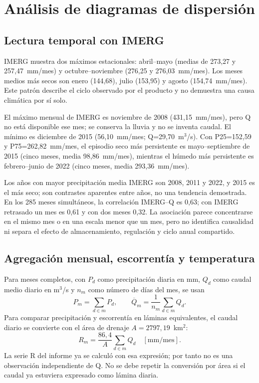 \section{Análisis de diagramas de dispersión}
\subsection{Lectura temporal con IMERG}
IMERG muestra dos máximos estacionales: abril--mayo (medias de 273,27 y 257,47~mm/mes) y octubre--noviembre (276,25 y 276,03~mm/mes). Los meses medios más secos son enero (144,68), julio (153,95) y agosto (154,74~mm/mes). Este patrón describe el ciclo observado por el producto y no demuestra una causa climática por sí solo.

El máximo mensual de IMERG es noviembre de 2008 (431,15~mm/mes), pero Q no está disponible ese mes; se conserva la lluvia y no se inventa caudal. El mínimo es diciembre de 2015 (56,10~mm/mes; Q=29,70~m$^3$/s). Con P25=152,59 y P75=262,82~mm/mes, el episodio seco más persistente es mayo--septiembre de 2015 (cinco meses, media 98,86~mm/mes), mientras el húmedo más persistente es febrero--junio de 2022 (cinco meses, media 293,36~mm/mes).

Los años con mayor precipitación media IMERG son 2008, 2011 y 2022, y 2015 es el más seco; son contrastes aparentes entre años, no una tendencia demostrada. En los 285 meses simultáneos, la correlación IMERG--Q es 0,63; con IMERG retrasado un mes es 0,61 y con dos meses 0,32. La asociación parece concentrarse en el mismo mes o en una escala menor que un mes, pero no identifica causalidad ni separa el efecto de almacenamiento, regulación y ciclo anual compartido.

\subsection{Agregación mensual, escorrentía y temperatura}
Para meses completos, con $P_d$ como precipitación diaria en mm, $Q_d$ como caudal medio diario en m$^3$/s y $n_m$ como número de días del mes, se usan
\[
P_m=\sum_{d\in m}P_d,\qquad \overline{Q}_m=\frac{1}{n_m}\sum_{d\in m}Q_d.
\]
Para comparar precipitación y escorrentía en láminas equivalentes, el caudal diario se convierte con el área de drenaje $A=2797,19$~km$^2$:
\[
R_m=\frac{86,4}{A}\sum_{d\in m}Q_d\quad [\mathrm{{mm/mes}}].
\]
La serie R del informe ya se calculó con esa expresión; por tanto no es una observación independiente de Q. No se debe repetir la conversión por área si el caudal ya estuviera expresado como lámina diaria.

